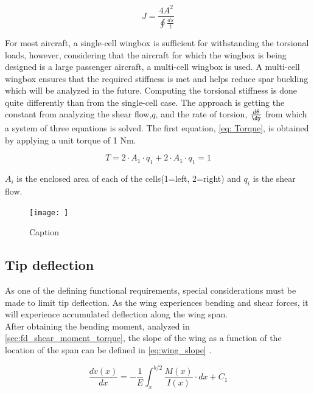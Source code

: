 \begin{equation}
J = \frac{4A^2}{\oint \frac{ds}{t}}
\label{eq:single-cell}
\end{equation}

For most aircraft, a single-cell wingbox is sufficient for withstanding the torsional loads, however, considering that the aircraft for which the wingbox is being designed is a large passenger aircraft, a multi-cell wingbox is used. A multi-cell wingbox ensures that the required stiffness is met and helps reduce spar buckling which will be analyzed in the future. Computing the torsional stiffness is done quite differently than from the single-cell case.  The approach is getting the constant from analyzing the shear flow,$q$, and the rate of torsion, $\frac{d\theta}{\dy}$ from which a system of three equations is solved. The first equation, \autoref{eq: Torque}, is obtained by applying a unit torque of 1 Nm. 

\begin{equation}
    T = 2\cdot A_1 \cdot q_1 + 2\cdot A_1 \cdot q_1 = 1
    \label{eq: Torque}
\end{equation}

$A_i$ is the enclosed area of each of the cells(1=left, 2=right) and $q_i$ is the shear flow. 

\begin{figure}
    \centering
    \texttt{[image: ]}
    \caption{Caption}
    \label{fig:enter-label}
\end{figure}

\subsection{Tip deflection}

As one of the defining functional requirements, special considerations must be made to limit tip deflection. As the wing experiences bending and shear forces, it will experience accumulated deflection along the wing span. \\

\noindent After obtaining the bending moment, analyzed in \autoref{sec:fd_shear_moment_torque}, the slope of the wing as a function of the location of the span can be defined in \autoref{eq:wing_slope} \cite[p. 599]{Hibbeler2018MechanicsUnits}. 

\begin{equation} \label{eq:wing_slope}
    \frac{dv(x)}{dx} = - \frac{1}{E} \int_{x}^{b/2} \frac{M(x)}{I(x)} \cdot dx + C_1
\end{equation}

